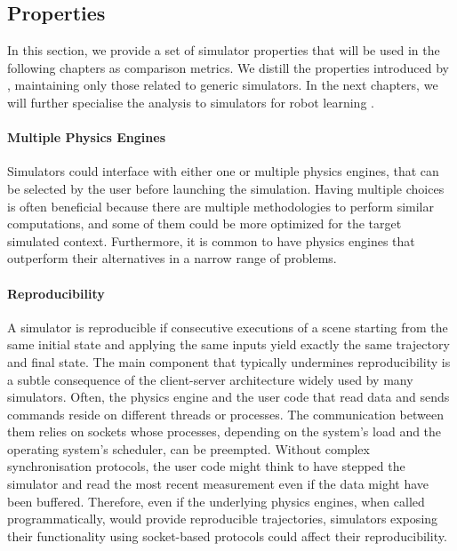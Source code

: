 \subsection{Properties}
\label{sec:simulator_properties}

In this section, we provide a set of simulator properties that will be used in the following chapters as comparison metrics.
We distill the properties introduced by \textcite{ferigo_gym-ignition_2020}, maintaining only those related to generic simulators.
In the next chapters, we will further specialise the analysis to simulators for robot learning .

\paragraph{Multiple Physics Engines}

Simulators could interface with either one or multiple physics engines, that can be selected by the user before launching the simulation.
Having multiple choices is often beneficial because there are multiple methodologies to perform similar computations, and some of them could be more optimized for the target simulated context.
Furthermore, it is common to have physics engines that outperform their alternatives in a narrow range of problems.

\paragraph{Reproducibility}

A simulator is reproducible if consecutive executions of a scene starting from the same initial state and applying the same inputs yield exactly the same trajectory and final state.
The main component that typically undermines reproducibility is a subtle consequence of the client-server architecture widely used by many simulators.
Often, the physics engine and the user code that read data and sends commands reside on different threads or processes.
The communication between them relies on sockets
whose processes, depending on the system's load and  the operating system's scheduler, can be preempted.
Without complex synchronisation protocols, the user code might think to have stepped the simulator and read the most recent measurement even if the data might have been buffered.
Therefore, even if the underlying physics engines, when called programmatically, would provide reproducible trajectories, simulators exposing their functionality using socket-based protocols could affect their reproducibility.

